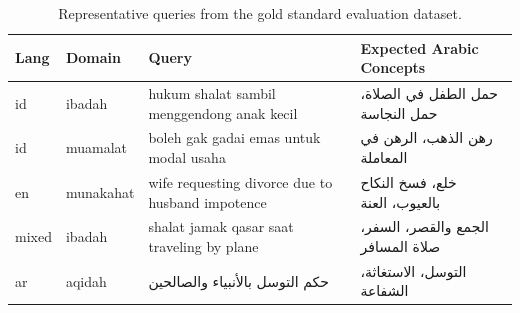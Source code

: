 \documentclass[preprint,12pt,authoryear]{elsarticle}
\newcommand{\ar}[1]{{\arabicfont #1}}
\newcommand{\ar}[1]{\textarabic{#1}}
\begin{document}
\begin{table}[t]
\centering
\caption{Representative queries from the gold standard evaluation dataset.}
\label{tab:query-examples}
\small
\begin{tabular}{llp{5cm}p{4.5cm}}
\toprule
Lang & Domain & Query & Expected Arabic Concepts \\
\midrule
id & ibadah & hukum shalat sambil menggendong anak kecil & \ar{حمل الطفل في الصلاة، حمل النجاسة} \\
id & muamalat & boleh gak gadai emas untuk modal usaha & \ar{رهن الذهب، الرهن في المعاملة} \\
en & munakahat & wife requesting divorce due to husband impotence & \ar{خلع، فسخ النكاح بالعيوب، العنة} \\
mixed & ibadah & shalat jamak qasar saat traveling by plane & \ar{الجمع والقصر، السفر، صلاة المسافر} \\
ar & aqidah & \ar{حكم التوسل بالأنبياء والصالحين} & \ar{التوسل، الاستغاثة، الشفاعة} \\
\bottomrule
\end{tabular}
\end{table}
\end{document}
